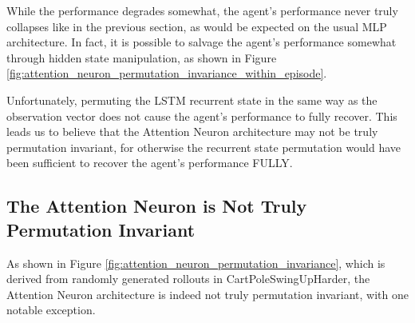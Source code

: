 \documentclass{article}
\begin{document}
While the performance degrades somewhat, the agent's performance never truly collapses 
like in the previous section,
as would be expected on the usual MLP architecture.
In fact, it is possible to salvage the agent's performance somewhat
through hidden state manipulation, as shown in Figure \ref{fig:attention_neuron_permutation_invariance_within_episode}.

Unfortunately, permuting the LSTM recurrent state in the same way as the observation vector
does not cause the agent's performance to fully recover.
This leads us to believe that the Attention Neuron architecture
may not be truly permutation invariant, for otherwise
the recurrent state permutation would have been sufficient to recover the agent's performance FULLY.

\newpage

\subsection{The Attention Neuron is Not Truly Permutation Invariant}
As shown in Figure \ref{fig:attention_neuron_permutation_invariance},
which is derived from randomly generated rollouts in CartPoleSwingUpHarder,
the Attention Neuron architecture is indeed not truly permutation invariant,
with one notable exception.
\end{document}
